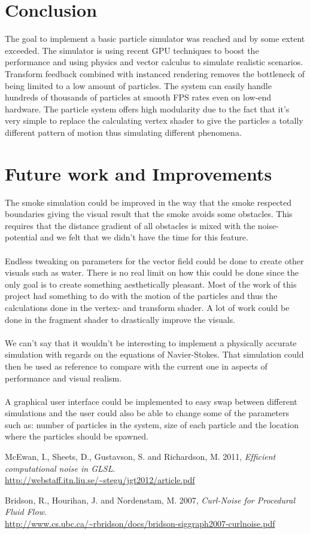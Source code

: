 \documentclass[report]{vgtc}
\begin{document}
\section{Conclusion}
The goal to implement a basic particle simulator was reached and by some extent exceeded. The simulator is using recent GPU techniques to boost the performance and using physics and vector calculus to simulate realistic scenarios. Transform feedback combined with instanced rendering removes the bottleneck of being limited to a low amount of particles. The system can easily handle hundreds of thousands of particles at smooth FPS rates even on low-end hardware. The particle system offers high modularity due to the fact that it’s very simple to replace the calculating vertex shader to give the particles a totally different pattern of motion thus simulating different phenomena.

\section{Future work and Improvements}
The smoke simulation could be improved in the way that the smoke respected boundaries giving the visual result that the smoke avoids some obstacles. This requires that the distance gradient of all obstacles is mixed with the noise-potential and we felt that we didn’t have the time for this feature. \\\\
Endless tweaking on parameters for the vector field could be done to create other visuals such as water. There is no real limit on how this could be done since the only goal is to create something aesthetically pleasant. Most of the work of this project had something to do with the motion of the particles and thus the calculations done in the vertex- and transform shader. A lot of work could be done in the fragment shader to drastically improve the visuals.\\\\
We can’t say that it wouldn’t be interesting to implement a physically accurate simulation with regards on the equations of Navier-Stokes. That simulation could then be used as reference to compare with the current one in aspects of performance and visual realism. \\\\
A graphical user interface could be implemented to easy swap between different simulations and the user could also be able to change some of the parameters such as: number of particles in the system, size of each particle and the location where the particles should be spawned. 
\\
\begin{thebibliography}{9}
  McEwan, I., Sheets, D., Gustavson, S. and Richardson, M. 2011,
  \emph{Efﬁcient computational noise in GLSL}.\\
\url{http://webstaff.itn.liu.se/~stegu/jgt2012/article.pdf}

  Bridson, R., Hourihan, J. and Nordenstam, M. 2007,
  \emph{Curl-Noise for Procedural Fluid Flow}.\\
\url{http://www.cs.ubc.ca/~rbridson/docs/bridson-siggraph2007-curlnoise.pdf}
\end{thebibliography}
\end{document}
